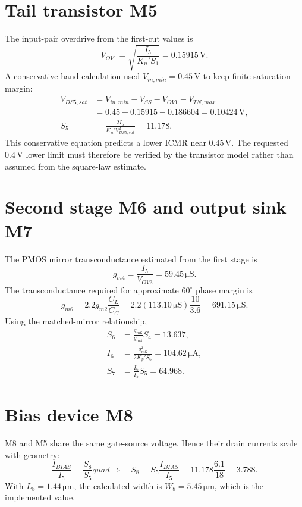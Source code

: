 \documentclass[11pt,a4paper]{report}
\newcommand{\micro}{\mu}
\newcommand{\SI}[2]{\ensuremath{#1\,\mathrm{#2}}}
\newcommand{\ang}[1]{\ensuremath{#1^{\circ}}}
\begin{document}
\section{Tail transistor M5}
The input-pair overdrive from the first-cut values is
\begin{equation}
V_{OV1}=\sqrt{\frac{I_5}{K_n'S_1}}=\SI{0.15915}{V}.
\end{equation}
A conservative hand calculation used $V_{in,min}=\SI{0.45}{V}$ to keep finite saturation margin:
\begin{align}
V_{DS5,sat}&=V_{in,min}-V_{SS}-V_{OV1}-V_{TN,max}\\
&=0.45-0.15915-0.186604=\SI{0.10424}{V},\\
S_5&=\frac{2I_5}{K_n'V_{DS5,sat}^2}=\boxed{11.178}.
\end{align}
This conservative equation predicts a lower ICMR near \SI{0.45}{V}. The requested \SI{0.4}{V} lower limit must therefore be verified by the transistor model rather than assumed from the square-law estimate.

\section{Second stage M6 and output sink M7}
The PMOS mirror transconductance estimated from the first stage is
\begin{equation}
g_{m4}=\frac{I_5}{V_{OV3}}=\SI{59.45}{\micro S}.
\end{equation}
The transconductance required for approximate \ang{60} phase margin is
\begin{equation}
g_{m6}=2.2g_{m2}\frac{C_L}{C_C}
=2.2(\SI{113.10}{\micro S})\frac{10}{3.6}
=\boxed{\SI{691.15}{\micro S}}.
\end{equation}
Using the matched-mirror relationship,
\begin{align}
S_6&=\frac{g_{m6}}{g_{m4}}S_4=\boxed{13.637},\\
I_6&=\frac{g_{m6}^2}{2K_p'S_6}=\boxed{\SI{104.62}{\micro A}},\\
S_7&=\frac{I_6}{I_5}S_5=\boxed{64.968}.
\end{align}

\section{Bias device M8}
M8 and M5 share the same gate-source voltage. Hence their drain currents scale with geometry:
\begin{equation}
\frac{I_{BIAS}}{I_5}=\frac{S_8}{S_5}quad\Rightarrow\quad
S_8=S_5\frac{I_{BIAS}}{I_5}
=11.178\frac{6.1}{18}=\boxed{3.788}.
\end{equation}
With $L_8=\SI{1.44}{\micro m}$, the calculated width is $W_8=\SI{5.45}{\micro m}$, which is the implemented value.
\end{document}
